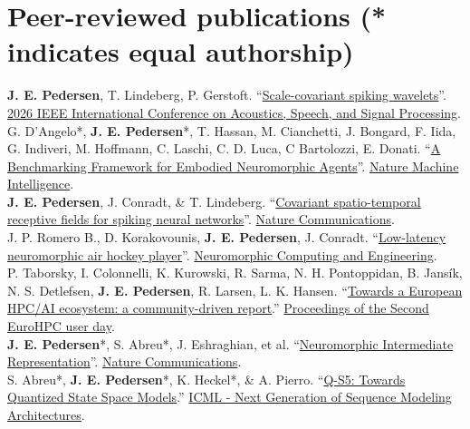 \documentclass[11pt, a4paper]{article}
\newcommand{\years}[1]{\marginnote{\scriptsize #1}}
\begin{document}
\section*{Peer-reviewed publications {\small (* indicates equal authorship)}}
\years{2026}\textbf{J. E. Pedersen}, T. Lindeberg, P. Gerstoft. ``\href{https://arxiv.org/abs/2602.02020}{Scale-covariant spiking wavelets}''. \href{https://2026.ieeeicassp.org/}{2026 IEEE International Conference on Acoustics, Speech, and Signal Processing}. \\
\years{2026}G. D'Angelo*, \textbf{J. E. Pedersen}*, T. Hassan, M. Cianchetti, J. Bongard, F. Iida, G. Indiveri, M. Hoffmann, C. Laschi, C. D. Luca, C Bartolozzi, E. Donati. ``\href{https://www.nature.com/articles/s42256-026-01197-w}{A Benchmarking Framework for Embodied Neuromorphic Agents}''. \href{https://www.nature.com/natmachintell/}{Nature Machine Intelligence}. \\
\years{2025}\textbf{J. E. Pedersen}, J. Conradt, \& T. Lindeberg. ``\href{https://arxiv.org/abs/2405.00318}{Covariant spatio-temporal receptive fields for spiking neural networks}''. \href{https://www.nature.com/ncomms/}{Nature Communications}. \\
\years{2025}J. P. Romero B., D. Korakovounis, \textbf{J. E. Pedersen}, J. Conradt. ``\href{https://doi.org/10.1088/2634-4386/addc15}{Low-latency neuromorphic air hockey player}''. \href{https://iopscience.iop.org/journal/2634-4386}{Neuromorphic Computing and Engineering}. \\
\years{2025} P. Taborsky, I. Colonnelli, K. Kurowski, R. Sarma, N. H. Pontoppidan, B. Jansík, N. S. Detlefsen, \textbf{J. E. Pedersen}, R. Larsen, L. K. Hansen. ``\href{https://www.sciencedirect.com/science/article/pii/S1877050925006301}{Towards a European HPC/AI ecosystem: a community-driven report}.'' \href{https://www.sciencedirect.com/journal/procedia-computer-science/vol/255/suppl/C}{Proceedings of the Second EuroHPC user day}. \\
\years{2024}\textbf{J. E. Pedersen}*, S. Abreu*, J. Eshraghian, et al. ``\href{https://doi.org/10.1038/s41467-024-52259-9}{Neuromorphic Intermediate Representation}''. \href{https://www.nature.com/ncomms/}{Nature Communications}. \\
\years{2024} S. Abreu*, \textbf{J. E. Pedersen}*, K. Heckel*, \& A. Pierro. ``\href{https://openreview.net/forum?id=30Rq6yXr8I}{Q-S5: Towards Quantized State Space Models}.'' \href{https://icml.cc/virtual/2024/workshop/29962}{ICML - Next Generation of Sequence Modeling Architectures}. \\
\end{document}
